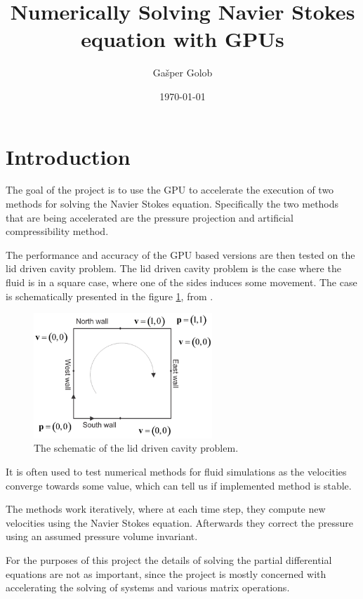 \documentclass{article}
\title{Numerically Solving Navier Stokes equation with GPUs}
\author{Gašper Golob}
\date{\today}
\begin{document}
\maketitle

\section{Introduction}
The goal of the project is to use the GPU to accelerate the execution of two methods for 
solving the Navier Stokes equation. Specifically the two methods that are being accelerated are
the pressure projection and artificial compressibility method.

The performance and accuracy of the GPU based versions are then tested on the 
lid driven cavity problem. The lid driven cavity problem is the case where the fluid is in 
a square case, where one of the sides induces some movement. 
The case is schematically presented in the figure \ref{fig:lid_driven_cavity}, 
from \cite{lidDriven}.
\begin{figure}[h!] 
    \centering 
    \includegraphics[width=0.6\textwidth]{plots/lid_driven_cavity.png} 
    \caption{The schematic of the lid driven cavity problem.} 
    \label{fig:lid_driven_cavity} 
\end{figure}
It is often used to test numerical methods for fluid simulations as the velocities converge towards 
some value, which can tell us if implemented method is stable.

The methods work iteratively, where at each time step, they compute new velocities using the 
Navier Stokes equation. Afterwards they correct the pressure using an assumed pressure volume 
invariant. 

For the purposes of this project the details of solving the partial differential equations are not 
as important, since the project is mostly concerned with accelerating the solving of systems and 
various matrix operations.
\end{document}
